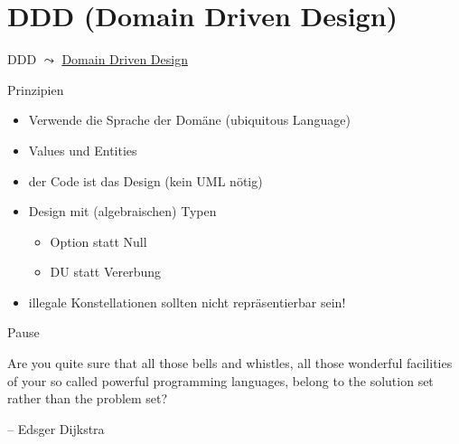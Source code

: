 \documentclass[t]{beamer}
\begin{document}
\section{DDD (Domain Driven Design) }
\label{sec:org028e2fc}
\begin{frame}[label={sec:org11528d4}]{DDD}
\(\leadsto\) \href{./4.1 DDD\_With\_Fsharp.pdf}{Domain Driven Design}
\end{frame}

\begin{frame}[label={sec:org39fa7b2}]{Prinzipien}
\begin{itemize}
\item Verwende die Sprache der Domäne (ubiquitous Language)
\item Values und Entities
\item der Code ist das Design (kein UML nötig)
\item Design mit (algebraischen) Typen
\begin{itemize}
\item Option statt Null
\item DU statt Vererbung
\end{itemize}
\item illegale Konstellationen sollten nicht repräsentierbar sein!
\end{itemize}
\end{frame}

\begin{frame}[label={sec:orgf55ebf9}]{Pause}
\begin{block}{}
Are you quite sure that all those bells and whistles, all those wonderful facilities of your so called powerful programming languages, belong to the solution set rather than the problem set?

\null\hfill -- Edsger Dijkstra
\end{block}
\end{frame}
\end{document}
